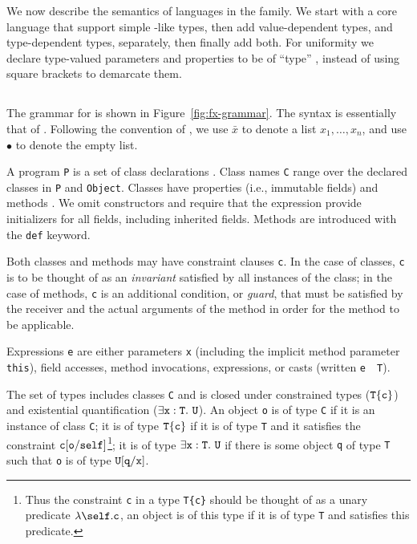 
\newcommand{\constraint}{{\tt constraint}}
\newcommand\cj[2]{{#1} \vdash {#2}~\constraint}
\newcommand\cjj[3]{{#1} \vdash {#2}~\constraint, {#3}~\constraint}
\newcommand\wj[2]{{#1} \vdash {#2}~\type}
\newcommand\tj[3]{{#1} \vdash {#2} \ty {#3}}
\newcommand\stj[3]{{#1} \vdash {#2} \subtype {#3}}

We now describe the semantics of languages in the \FX{} family.
We start with a core \FXZ{} language that support simple
\FJ-like types, then add value-dependent types, and type-dependent
types, separately, then finally add both. For uniformity we declare type-valued parameters and properties to be of ``type'' \type, instead of using square brackets to demarcate them.

\subsection{\FXZ}

The grammar for \FXZ{} is shown in Figure~\ref{fig:fx-grammar}.
The syntax is essentially that of \FJ{}.
Following the convention of \FJ{}, we use $\bar{x}$ to denote a
list $x_1, \dots, x_n$, and use $\bullet$ to denote the empty
list.

A program {\tt P} is a set of class declarations .
Class names {\tt C} range over the declared classes in {\tt P} 
and {\tt Object}.
Classes have
properties (i.e., immutable fields)  and methods .  We omit constructors
and require that the \new{} expression provide initializers
for all fields, including inherited fields. 
Methods are introduced with the {\tt def} keyword.

Both classes and methods may have constraint clauses
{\tt c}.  In the case of classes, {\tt c} is to be thought of as an
{\em invariant} satisfied by all instances of the class; in the case of
methods, {\tt c} is an additional condition, or {\em guard},
that must be satisfied by
the receiver 
and the actual arguments of the method in order for the method to
be applicable.

Expressions {\tt e} are either parameters {\tt x} (including the implicit
method parameter {\tt this}), field accesses, method invocations, \new{}
expressions, or casts (written {\tt e}~\as~{\tt T}).

The set of types includes classes {\tt C} and is closed under
constrained types ($\tt T\{c\}$) and existential
quantification ($\exists \tt x:T.~U$).
An object {\tt o} is of type {\tt C} if it is an instance of class {\tt C}; it is of type $\tt
T\{c\}$ if it is of type {\tt T} and it satisfies the constraint $\tt
c[o/self]$\footnote{Thus the constraint {\tt c} in a type {\tt T\{c\}}
should be thought of as a unary predicate $\lambda\self.{\tt c}$, an
object is of this type if it is of type {\tt T} and satisfies this
predicate.}; it is of type $\exists \tt x:T.~U$
if there is some object {\tt q}
of type {\tt T} such that {\tt o} is of type
$\tt U[q/x]$.

